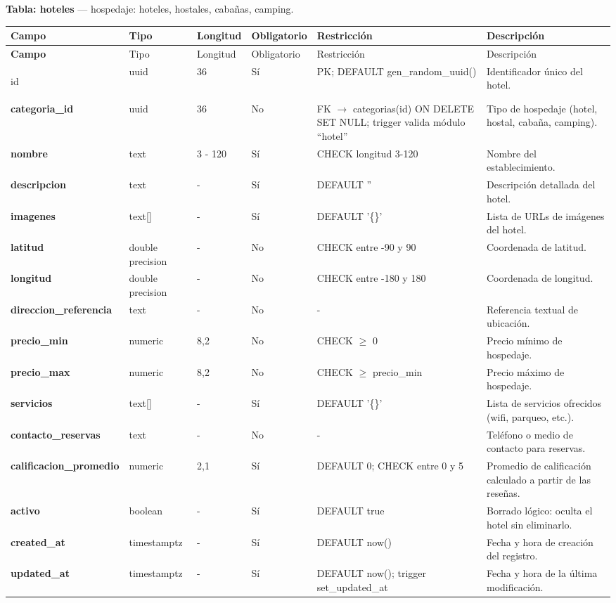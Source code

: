 \bigskip
\noindent\textbf{Tabla: hoteles} — hospedaje: hoteles, hostales, cabañas, camping.

{\footnotesize
\begin{longtable}{|>{\bfseries}p{3.3cm}|p{2.6cm}|p{1.2cm}|p{1.6cm}|p{2.8cm}|p{4.0cm}|}
\hline
Campo & Tipo & Longitud & Obligatorio & Restricción & Descripción \\ \hline
\endfirsthead
\hline
Campo & Tipo & Longitud & Obligatorio & Restricción & Descripción \\ \hline
\endhead
\hline
\endfoot
\hline
\endlastfoot

id & uuid & 36 & Sí & PK; DEFAULT gen\_random\_uuid() & Identificador único del hotel. \\ \hline
categoria\_id & uuid & 36 & No & FK $\rightarrow$ categorias(id) ON DELETE SET NULL; trigger valida módulo ``hotel'' & Tipo de hospedaje (hotel, hostal, cabaña, camping). \\ \hline
nombre & text & 3 - 120 & Sí & CHECK longitud 3-120 & Nombre del establecimiento. \\ \hline
descripcion & text & - & Sí & DEFAULT '' & Descripción detallada del hotel. \\ \hline
imagenes & text[] & - & Sí & DEFAULT '\{\}' & Lista de URLs de imágenes del hotel. \\ \hline
latitud & double precision & - & No & CHECK entre -90 y 90 & Coordenada de latitud. \\ \hline
longitud & double precision & - & No & CHECK entre -180 y 180 & Coordenada de longitud. \\ \hline
direccion\_referencia & text & - & No & - & Referencia textual de ubicación. \\ \hline
precio\_min & numeric & 8,2 & No & CHECK $\geq$ 0 & Precio mínimo de hospedaje. \\ \hline
precio\_max & numeric & 8,2 & No & CHECK $\geq$ precio\_min & Precio máximo de hospedaje. \\ \hline
servicios & text[] & - & Sí & DEFAULT '\{\}' & Lista de servicios ofrecidos (wifi, parqueo, etc.). \\ \hline
contacto\_reservas & text & - & No & - & Teléfono o medio de contacto para reservas. \\ \hline
calificacion\_promedio & numeric & 2,1 & Sí & DEFAULT 0; CHECK entre 0 y 5 & Promedio de calificación calculado a partir de las reseñas. \\ \hline
activo & boolean & - & Sí & DEFAULT true & Borrado lógico: oculta el hotel sin eliminarlo. \\ \hline
created\_at & timestamptz & - & Sí & DEFAULT now() & Fecha y hora de creación del registro. \\ \hline
updated\_at & timestamptz & - & Sí & DEFAULT now(); trigger set\_updated\_at & Fecha y hora de la última modificación. \\ \hline
\end{longtable}
}

